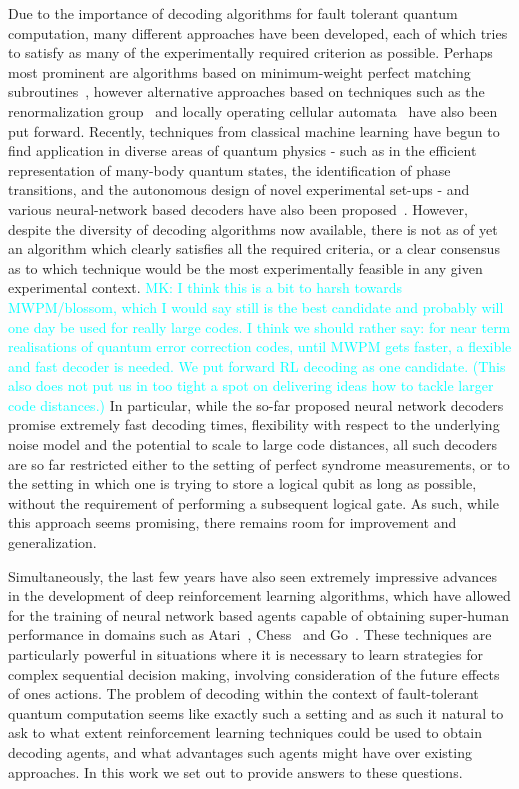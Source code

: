 \documentclass[twocolumn,preprintnumbers,amsmath,amssymb,notitlepage,nofootinbib,longbibliography,superscriptaddress,aps,pra,10pt]{revtex4-1}
\newcommand{\mk}[1]{\textcolor{Cyan}{MK: #1}}
\begin{document}
	Due to the importance of decoding algorithms for fault tolerant quantum computation, many different approaches have been developed, each of which tries to satisfy as many of the experimentally required criterion as possible.
	Perhaps most prominent are algorithms based on minimum-weight perfect matching subroutines~\cite{Fowler13}, however alternative approaches based on techniques such as the renormalization group~\cite{Duclos2010} and locally operating cellular automata~\cite{Herold15} have also been put forward.
	Recently, techniques from classical machine learning have begun to find application in diverse areas of quantum physics - such as in the efficient representation of many-body quantum states, the identification of phase transitions, and the autonomous design of novel experimental set-ups - and various neural-network based decoders have also been proposed~\cite{Torlai10, Varsamopoulos17, Krastanov17, Breuckmann18, Baireuther18a, Baireuther18b, Ni18}.
	However, despite the diversity of decoding algorithms now available, there is not as of yet an algorithm which clearly satisfies all the required criteria, or a clear consensus as to which technique would be the most experimentally feasible in any given experimental context.
	\mk{
		I think this is a bit to harsh towards MWPM/blossom, which I would say still is the best candidate and probably will one day be used for really large codes.
		I think we should rather say: for near term realisations of quantum error correction codes, until MWPM gets faster, a flexible and fast decoder is needed.
		We put forward RL decoding as one candidate.
		(This also does not put us in too tight a spot on delivering ideas how to tackle larger code distances.)
	}
	In particular, while the so-far proposed neural network decoders promise extremely fast decoding times, flexibility with respect to the underlying noise model and the potential to scale to large code distances, all such decoders are so far restricted either to the setting of perfect syndrome measurements, or to the setting in which one is trying to store a logical qubit as long as possible, without the requirement of performing a subsequent logical gate.
	As such, while this approach seems promising, there remains room for improvement and generalization.

	Simultaneously, the last few years have also seen extremely impressive advances in the development of deep reinforcement learning algorithms, which have allowed for the training of neural network based agents capable of obtaining super-human performance in domains such as Atari~\cite{Mnih15}, Chess~\cite{Silver17a} and Go~\cite{Silver17b}.
	These techniques are particularly powerful in situations where it is necessary to learn strategies for complex sequential decision making, involving consideration of the future effects of ones actions.
	The problem of decoding within the context of fault-tolerant quantum computation seems like exactly such a setting and as such it natural to ask to what extent reinforcement learning techniques could be used to obtain decoding agents, and what advantages such agents might have over existing approaches.
	In this work we set out to provide answers to these questions.
\end{document}
